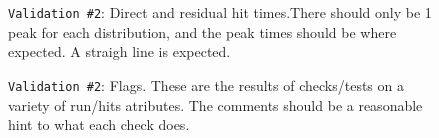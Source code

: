 \documentclass[12pt]{article}
\begin{document}
\begin{figure}
\centering
\noindent{}
  \caption{\centering \texttt{Validation \#2}: Direct and residual hit times.\hspace{\textwidth}There should only be 1 peak for each distribution, and the peak times should be where expected. A straigh line is expected. }
  \label{fig:val23}
\end{figure}

\begin{figure}
\centering
\noindent{}
  \caption{\centering \texttt{Validation \#2}: Flags. These are the results of checks/tests on a variety of run/hits atributes. The comments should be a reasonable hint to what each check does.}
  \label{fig:val24}
\end{figure}
\end{document}
